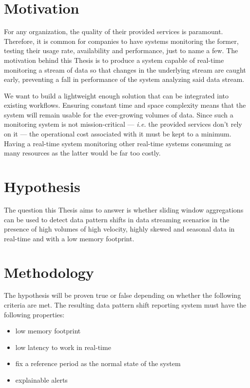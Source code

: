 \section{Motivation} \label{sec:motivation}
For any organization, the quality of their provided services is paramount. Therefore, it is common for companies to have systems monitoring the former, testing their usage rate, availability and performance, just to name a few. The motivation behind this Thesis is to produce a system capable of real-time monitoring a stream of data so that changes in the underlying stream are caught early, preventing a fall in performance of the system analyzing said data stream. 

We want to build a lightweight enough solution that can be integrated into existing workflows. Ensuring constant time and space complexity means that the system will remain usable for the ever-growing volumes of data. Since such a monitoring system is not mission-critical --- \textit{i.e.} the provided services don't rely on it --- the operational cost associated with it must be kept to a minimum. Having a real-time system monitoring other real-time systems consuming as many resources as the latter would be far too costly.

\section{Hypothesis} \label{sec:hypothesis}
The question this Thesis aims to answer is whether sliding window aggregations can be used to detect data pattern shifts in data streaming scenarios in the presence of high volumes of high velocity, highly skewed and seasonal data in real-time and with a low memory footprint.

\section{Methodology} \label{sec:methodology}

The hypothesis will be proven true or false depending on whether the following criteria are met. The resulting data pattern shift reporting system must have the following properties:
\begin{itemize}
    \item low memory footprint
    
    \item low latency to work in real-time
    
    \item fix a reference period as the normal state of the system
    
    \item explainable alerts
\end{itemize}

